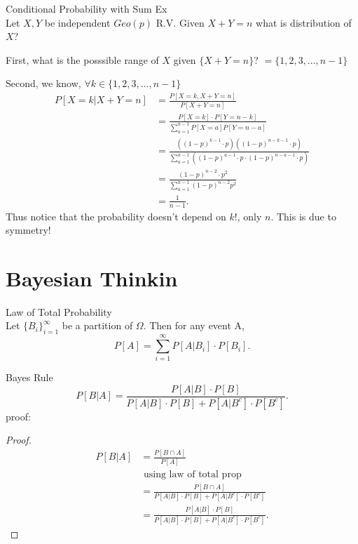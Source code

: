 \documentclass[a4paper]{article}
\begin{document}
\begin{note}{Conditional Probability with Sum Ex}\\
  Let $X,Y$ be independent $Geo(p)$ R.V. Given  $X+Y=n$ what is distribution of  $X$?

  First, what is the posssible range of  $X$ given  $\{X+Y = n\} $? $= \{1,2,3, \ldots, n-1\} $ 

  Second, we know, $\forall k \in \{1,2,3, \ldots, n-1\} $
  \begin{align*}
    P[X=k| X+Y = n] &= \frac{P[X=k, X+Y = n]}{P[X+Y=n]} \\
                    &= \frac{P[X=k] \cdot P[Y = n-k]}{\sum_{a=1}^{n-1} P[X=a]P[Y=n-a]} \\
                    &= \frac{\left( (1-p)^{k-1} \cdot p \right) \left( (1-p)^{n-k-1} \cdot p \right)}{
                    \sum_{a=1}^{n-1} \left( (1-p)^{a-1} \cdot p \cdot (1-p)^{n-a-1} \cdot p \right) } \\
                    &= \frac{(1-p)^{n-2} \cdot p^2}{\sum_{a=1}^{n-1} (1-p)^{n-2}p^2} \\
                    &= \frac{1}{n-1}
  .\end{align*}
  Thus notice that the probability doesn't depend on $k$!, only  $n$. This is due to symmetry!
\end{note}

\section{Bayesian Thinkin}
\begin{prop}{Law of Total Probability}\\
  Let  $\{B_i\}_{i=1}^\infty $ be a partition of $\Omega$. Then for any event A,
   \[
     P[A] = \sum_{i=1}^\infty P[A | B_i] \cdot P[B_i]
  .\] 
\end{prop}

\begin{definition}{Bayes Rule} \\
  \[
    P[B|A] = \frac{P[A|B] \cdot P[B]}{P[A|B] \cdot P[B] + P[A|B^c] \cdot P[B^c]}
  .\] 
  proof:
  \begin{proof}
    \begin{align*}
      P[B|A] &= \frac{P[B \cap A]}{P[A]} \\
             & \text{ using law of total prop} \\
             &= \frac{P[B \cap A]}{P[A|B] \cdot P[B] + P[A|B^c] \cdot P[B^c]} \\
             &= \frac{P[A|B] \cdot P[B]}{P[A|B] \cdot P[B] + P[A|B^c] \cdot P[B^c]}
    .\end{align*}
  \end{proof}
\end{definition}
\end{document}

